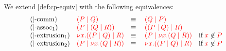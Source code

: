 \begin{definition}\label{def:nc-equiv}
  We extend \cref{def:cp-equiv} with the following equivalences:
  \[
    \begin{array}{llll}
      (|\text{-comm})
      & \textcolor{red}{(P \mid Q)}
      & \equiv \;
      & \textcolor{red}{(Q \mid P)}
      \\
      (|\text{-assoc}_1)
      & \textcolor{red}{(P \mid (Q \mid R))}
      & \equiv \;
      & \textcolor{red}{((P \mid Q) \mid R)}
      \\
      ({|}\text{-extrusion}_{1})
      & \textcolor{red}{\nu x.((P \mid Q) \mid R)}
      & \equiv \;
      & \textcolor{red}{(P \mid \nu x.(Q \mid R))} \quad \text{if} \; \textcolor{red}{x}\not\in\textcolor{red}{P} 
      \\
      ({|}\text{-extrusion}_{2})
      & \textcolor{red}{(P \mid \nu x.(Q \mid R))}
      & \equiv \;
      & \textcolor{red}{\nu x.((P \mid Q) \mid R)} \quad \text{if} \; \textcolor{red}{x}\not\in\textcolor{red}{P} 
    \end{array}
  \]
\end{definition} 
